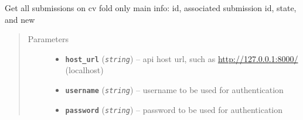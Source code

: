 \documentclass[letterpaper,10pt,english]{sphinxmanual}
\begin{document}
\begin{fulllineitems}
\label{modules/views:test_files.post_api.get_submission_fold_light}
Get all submissions on cv fold    only main info: id, associated submission id, state, and new
\begin{quote}\begin{description}
\item[{Parameters}] \leavevmode\begin{itemize}
\item {} 
\textbf{\texttt{host\_url}} (\emph{\texttt{string}}) -- api host url, such as \url{http://127.0.0.1:8000/} (localhost)

\item {} 
\textbf{\texttt{username}} (\emph{\texttt{string}}) -- username to be used for authentication

\item {} 
\textbf{\texttt{password}} (\emph{\texttt{string}}) -- password to be used for authentication

\end{itemize}

\end{description}\end{quote}

\end{fulllineitems}

\end{document}
